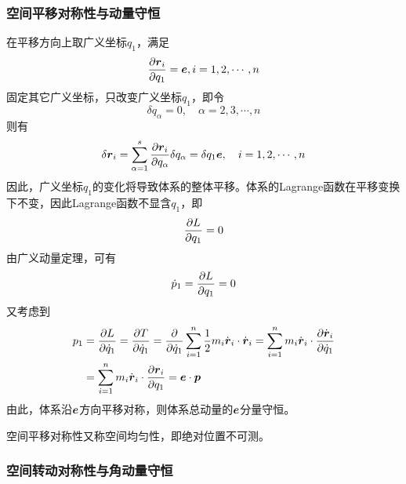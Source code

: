 \subsubsection{空间平移对称性与动量守恒}

在平移方向上取广义坐标$q_1$，满足
\begin{equation*}
	\frac{\partial \boldsymbol{r}_i}{\partial q_1} = \boldsymbol{e},i =1,2,\cdots,n
\end{equation*}
固定其它广义坐标，只改变广义坐标$q_1$，即令
\begin{equation*}
	\delta q_\alpha = 0 ,\quad \alpha = 2,3,\cdots,n
\end{equation*}
则有
\begin{equation*}
	\delta \boldsymbol{r}_i = \sum_{\alpha=1}^s \frac{\partial \boldsymbol{r}_i}{\partial q_\alpha} \delta q_\alpha = \delta q_1 \boldsymbol{e},\quad i = 1,2,\cdots,n
\end{equation*}
因此，广义坐标$q_1$的变化将导致体系的整体平移。体系的Lagrange函数在平移变换下不变，因此Lagrange函数不显含$q_1$，即
\begin{equation*}
	\frac{\partial L}{\partial q_1} = 0
\end{equation*}
由广义动量定理，可有
\begin{equation*}
	\dot{p}_1 = \frac{\partial L}{\partial q_1} = 0
\end{equation*}
又考虑到
\begin{align*}
	p_1 & = \frac{\partial L}{\partial \dot{q}_1} = \frac{\partial T}{\partial \dot{q}_1} = \frac{\partial}{\partial \dot{q}_1} \sum_{i=1}^n \frac12 m_i \dot{\boldsymbol{r}}_i \cdot \dot{\boldsymbol{r}}_i = \sum_{i=1}^n m_i \dot{\boldsymbol{r}}_i \cdot \frac{\partial \dot{\boldsymbol{r}}_i}{\partial \dot{q}_1} \\
	& = \sum_{i=1}^n m_i \dot{\boldsymbol{r}}_i \cdot \frac{\partial \boldsymbol{r}_i}{\partial q_1} = \boldsymbol{e} \cdot \boldsymbol{p}
\end{align*}
由此，体系沿$\boldsymbol{e}$方向平移对称，则体系总动量的$\boldsymbol{e}$分量守恒。

空间平移对称性又称{\heiti 空间均匀性}，即绝对位置不可测。

\subsubsection{空间转动对称性与角动量守恒}

